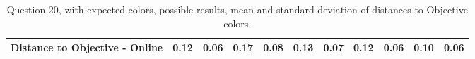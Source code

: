 \begin{table}[!htbp]
{\begin{tabular}{lccccccccccccc}
    \multicolumn{4}{l|}{Distance to Objective - Online}                                                                                                                & 0.12                  & \multicolumn{1}{c|}{0.06}          & 0.17                  & \multicolumn{1}{c|}{0.08}          & 0.13                 & \multicolumn{1}{c|}{0.07}          & 0.12                 & \multicolumn{1}{c|}{0.06}          & \textbf{0.10}         & \multicolumn{1}{c|}{0.06}         \\ \hline
  \end{tabular}}
  \caption[Question 20, with expected Results.]{Question 20, with expected colors, possible results, mean and standard deviation of distances to Objective colors.}
  \vspace{-5pt}
  \label{table:lab_q20_expected}
\end{table}
%
